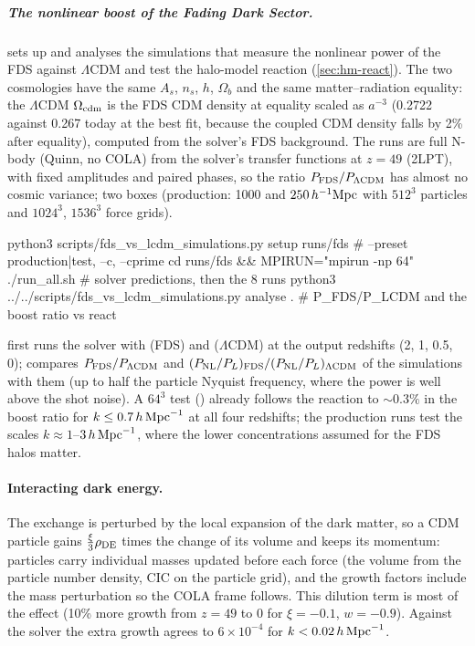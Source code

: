 \subparagraph*{The nonlinear boost of the Fading Dark Sector.}\label{sec:mgsims-fds-boost}
 sets up and analyses the simulations that measure the nonlinear
power of the FDS against $\Lambda$CDM and test the halo-model reaction (\cref{sec:hm-react}). The two cosmologies have the
same $A_s$, $n_s$, $h$, $\Omega_b$ and the same matter--radiation equality: the $\Lambda$CDM $\Omega_{\rm cdm}$ is the FDS CDM
density at equality scaled as $a^{-3}$ (0.2722 against 0.267 today at the best fit, because the coupled CDM density falls by
2\% after equality), computed from the solver's FDS background. The runs are full N-body (Quinn, no COLA) from the
solver's transfer functions at $z=49$ (2LPT), with fixed amplitudes and paired phases, so the ratio $P_{\rm FDS}/P_{\Lambda\rm
CDM}$ has almost no cosmic variance; two boxes (production: 1000 and $250\,h^{-1}\mathrm{Mpc}$ with $512^3$ particles and $1024^3$,
$1536^3$ force grids).
\begin{paramfile}
python3 scripts/fds_vs_lcdm_simulations.py setup runs/fds   # --preset production|test, --c, --cprime
cd runs/fds && MPIRUN="mpirun -np 64" ./run_all.sh         # solver predictions, then the 8 runs
python3 ../../scripts/fds_vs_lcdm_simulations.py analyse .  # P_FDS/P_LCDM and the boost ratio vs react
\end{paramfile}
 first runs the solver with  (FDS) and  ($\Lambda$CDM) at the
output redshifts (2, 1, 0.5, 0);  compares $P_{\rm FDS}/P_{\Lambda\rm CDM}$ and
$(P_{\rm NL}/P_L)_{\rm FDS}/(P_{\rm NL}/P_L)_{\Lambda\rm CDM}$ of the simulations with them (up to half the particle Nyquist
frequency, where the power is well above the shot noise). A $64^3$ test () already follows the reaction
to $\sim0.3\%$ in the boost ratio for $k\le0.7\,h\,\mathrm{Mpc}^{-1}$ at all four redshifts; the production runs test the scales
$k\approx1$--$3\,h\,\mathrm{Mpc}^{-1}$, where the lower concentrations assumed for the FDS halos matter.

\paragraph*{Interacting dark energy.} The exchange is perturbed by the local expansion of the dark matter, so a CDM
particle gains $\frac{\xi}{3}\rho_{\rm DE}$ times the change of its volume and keeps its momentum: particles carry
individual masses updated before each force (the volume from the particle number density, CIC on the particle grid),
and the growth factors include the mass perturbation so the COLA frame follows. This dilution term is most of the
effect (10\% more growth from $z=49$ to 0 for $\xi=-0.1$, $w=-0.9$). Against the solver the extra growth agrees to
$6\times10^{-4}$ for $k<0.02\,h\,\mathrm{Mpc}^{-1}$.
